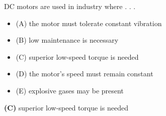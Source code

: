

DC motors are used in industry where . . .

\begin{itemize}
\item{(A)} the motor must tolerate constant vibration
\vskip 5pt 
\item{(B)} low maintenance is necessary
\vskip 5pt 
\item{(C)} superior low-speed torque is needed
\vskip 5pt 
\item{(D)} the motor's speed must remain constant
\vskip 5pt 
\item{(E)} explosive gases may be present
\end{itemize}







{\bf (C)} superior low-speed torque is needed











